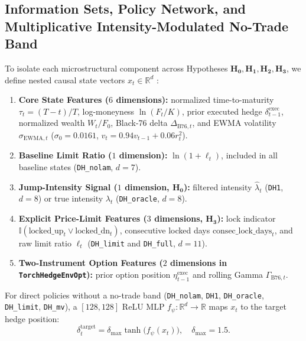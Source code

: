 \documentclass[11pt,a4paper]{article}
\begin{document}
\subsection{Information Sets, Policy Network, and Multiplicative Intensity-Modulated No-Trade Band}
To isolate each microstructural component across Hypotheses $\mathbf{H_0, H_1, H_2, H_3}$, we define nested causal state vectors $x_t \in \mathbb{R}^d$ \citep{NaWan2023,Goudenege2023}:
\begin{enumerate}
  \item \textbf{Core State Features ($6$ dimensions):} normalized time-to-maturity $\tau_t = (T - t)/T$, log-moneyness $\ln(F_t / K)$, prior executed hedge $\delta_{t-1}^{\text{exec}}$, normalized wealth $W_t / F_0$, Black-76 delta $\Delta_{\text{B76},t}$, and EWMA volatility $\sigma_{\text{EWMA},t}$ ($\sigma_0 = 0.0161$, $v_t = 0.94 v_{t-1} + 0.06 r_t^2$).
  \item \textbf{Baseline Limit Ratio ($1$ dimension):} $\ln(1 + \ell_t)$, included in all baseline states (\texttt{DH\_nolam}, $d = 7$).
  \item \textbf{Jump-Intensity Signal ($1$ dimension, $\mathbf{H_0}$):} filtered intensity $\hat{\lambda}_t$ (\texttt{DH1}, $d = 8$) or true intensity $\lambda_t$ (\texttt{DH\_oracle}, $d = 8$).
  \item \textbf{Explicit Price-Limit Features ($3$ dimensions, $\mathbf{H_3}$):} lock indicator $\mathbb{I}(\text{locked\_up}_t \lor \text{locked\_dn}_t)$, consecutive locked days $\text{consec\_lock\_days}_t$, and raw limit ratio $\ell_t$ (\texttt{DH\_limit} and \texttt{DH\_full}, $d = 11$).
  \item \textbf{Two-Instrument Option Features ($2$ dimensions in \texttt{TorchHedgeEnvOpt}):} prior option position $\eta_{t-1}^{\text{exec}}$ and rolling Gamma $\Gamma_{\text{B76},t}$.
\end{enumerate}

For direct policies without a no-trade band (\texttt{DH\_nolam}, \texttt{DH1}, \texttt{DH\_oracle}, \texttt{DH\_limit}, \texttt{DH\_mv}), a $[128, 128]$ ReLU MLP $f_\psi: \mathbb{R}^d \to \mathbb{R}$ maps $x_t$ to the target hedge position:
\begin{equation}
  \delta_t^{\text{target}} = \delta_{\max} \tanh\big(f_\psi(x_t)\big), \quad \delta_{\max} = 1.5.
  \label{eq:direct_policy}
\end{equation}
\end{document}
